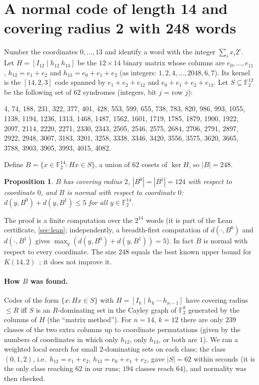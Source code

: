 \documentclass[11pt]{article}
\numberwithin{equation}{section}
\newtheorem{proposition}[theorem]{Proposition}
\theoremstyle{definition}
\theoremstyle{remark}
\newcommand{\F}{\mathbb F}
\begin{document}
\section{A normal code of length 14 and covering radius 2 with 248 words}\label{sec:B}
Number the coordinates $0,\dots,13$ and identify a word with the integer $\sum_i x_i2^i$.
Let $H=[I_{12}\mid h_{12}\ h_{13}]$ be the $12\times14$ binary matrix whose columns are
$e_0,\dots,e_{11}$, $h_{12}=e_1+e_2$ and $h_{13}=e_0+e_1+e_2$ (as integers: $1,2,4,\dots,2048,6,7$).
Its kernel is the $[14,2,3]$ code spanned by $e_1+e_2+e_{12}$ and $e_0+e_1+e_2+e_{13}$. Let $S\subseteq\F_2^{12}$
be the following set of $62$ syndromes (integers, bit $j$ = row $j$):
\begin{center}\small
\begin{minipage}{0.92\linewidth}\raggedright
4, 74, 188, 231, 322, 377, 401, 428, 553, 599, 655, 738, 783, 820, 986, 993, 1055, 1138, 1194, 1236,
1313, 1468, 1487, 1562, 1601, 1719, 1785, 1879, 1900, 1922, 2097, 2114, 2220, 2271, 2330, 2343, 2505,
2546, 2575, 2684, 2706, 2791, 2897, 2922, 2948, 3007, 3183, 3201, 3258, 3338, 3346, 3420, 3556, 3575,
3620, 3665, 3788, 3903, 3905, 3993, 4015, 4082.
\end{minipage}
\end{center}
Define $B=\{x\in\F_2^{14}: Hx\in S\}$, a union of $62$ cosets of $\ker H$, so $|B|=248$.

\begin{proposition}\label{prop:B}
$B$ has covering radius $2$, $|B^0|=|B^1|=124$ with respect to coordinate $0$, and $B$ is normal with
respect to coordinate $0$: $d(y,B^0)+d(y,B^1)\le5$ for all $y\in\F_2^{14}$.
\end{proposition}
The proof is a finite computation over the $2^{14}$ words (it is part of the Lean certificate,
\cref{sec:lean}; independently, a breadth-first computation of $d(\cdot,B^0)$ and $d(\cdot,B^1)$ gives
$\max_y(d(y,B^0)+d(y,B^1))=5$). In fact $B$ is normal with respect to every coordinate.
The size $248$ equals the best known upper bound for $K(14,2)$~\cite{Keri}; it does not improve it.

\paragraph{How $B$ was found.} Codes of the form $\{x:Hx\in S\}$ with $H=[I_k\mid h_{k}\ \cdots\ h_{n-1}]$
have covering radius $\le R$ iff $S$ is an $R$-dominating set in the Cayley graph of $\F_2^k$ generated by
the columns of $H$ (the ``matrix method''). For $n=14$, $k=12$ there are only $239$
classes of the two extra columns up to coordinate permutations (given by the numbers of coordinates in
which only $h_{12}$, only $h_{13}$, or both are $1$). We ran a weighted local search for small
$2$-dominating sets on each class; the class $(0,1,2)$, i.e.\ $h_{12}=e_1+e_2$, $h_{13}=e_0+e_1+e_2$,
gave $|S|=62$ within seconds (it is the only class reaching $62$ in our runs; $194$ classes reach $64$), and normality was then checked.
\end{document}
